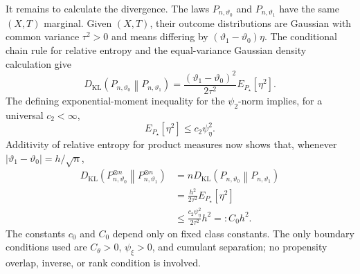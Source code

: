 It remains to calculate the divergence.  The laws \(P_{n,\vartheta_0}\) and \(P_{n,\vartheta_1}\) have the same \((X,T)\) marginal.  Given \((X,T)\), their outcome distributions are Gaussian with common variance \(\tau^2>0\) and means differing by \((\vartheta_1-\vartheta_0)\eta\).  The conditional chain rule for relative entropy and the equal-variance Gaussian density calculation give
\[
 D_{\mathrm{KL}}\!\left(P_{n,\vartheta_0}\middle\|P_{n,\vartheta_1}\right)
 =\frac{(\vartheta_1-\vartheta_0)^2}{2\tau^2}
 E_{P_{\star}}[\eta^2].
\]
The defining exponential-moment inequality for the \(\psi_2\)-norm implies, for a universal \(c_2<\infty\),
\[
 E_{P_{\star}}[\eta^2]\le c_2\psi_{\eta}^2.
\]
Additivity of relative entropy for product measures now shows that, whenever \(|\vartheta_1-\vartheta_0|=h/\sqrt n\),
\[
 \begin{aligned}
 D_{\mathrm{KL}}\!\left(P_{n,\vartheta_0}^{\otimes n}
          \middle\|P_{n,\vartheta_1}^{\otimes n}\right)
 &=nD_{\mathrm{KL}}\!\left(P_{n,\vartheta_0}
          \middle\|P_{n,\vartheta_1}\right)\\
 &=\frac{h^2}{2\tau^2}E_{P_{\star}}[\eta^2]\\
 &\le \frac{c_2\psi_{\eta}^2}{2\tau^2}h^2
 =:C_0h^2.
 \end{aligned}
\]
The constants \(c_0\) and \(C_0\) depend only on fixed class constants.  The only boundary conditions used are \(C_{\theta}>0\), \(\psi_{\xi}>0\), and cumulant separation; no propensity overlap, inverse, or rank condition is involved.